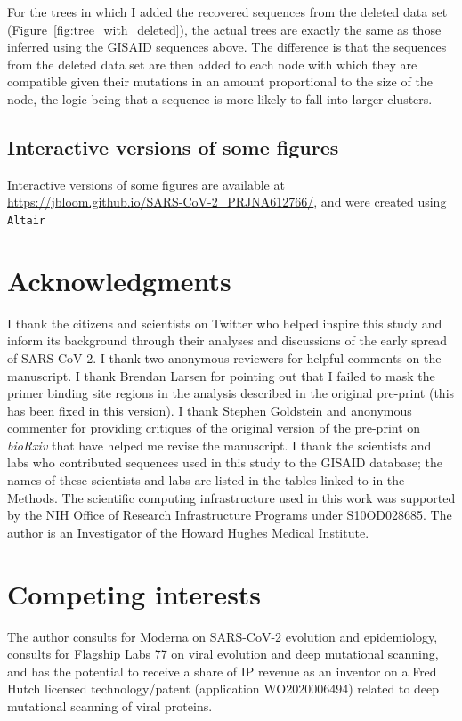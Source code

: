 \documentclass[9pt,twocolumn,twoside]{gsajnl_modified}
\begin{document}
{For the trees in which I added the recovered sequences from the deleted data set (Figure~\ref{fig:tree_with_deleted}), the actual trees are exactly the same as those inferred using the GISAID sequences above.
The difference is that the sequences from the deleted data set are then added to each node with which they are compatible given their mutations in an amount proportional to the size of the node, the logic being that a sequence is more likely to fall into larger clusters.

\subsection{Interactive versions of some figures}
Interactive versions of some figures are available at \url{https://jbloom.github.io/SARS-CoV-2_PRJNA612766/}, and were created using \texttt{Altair}~\citep{vanderplas2018altair}

\section{Acknowledgments}
I thank the citizens and scientists on Twitter who helped inspire this study and inform its background through their analyses and discussions of the early spread of SARS-CoV-2.
I thank two anonymous reviewers for helpful comments on the manuscript.
I thank Brendan Larsen for pointing out that I failed to mask the primer binding site regions in the analysis described in the original pre-print (this has been fixed in this version).
I thank Stephen Goldstein and anonymous commenter for providing critiques of the original version of the pre-print on \textit{bioRxiv} that have helped me revise the manuscript.
I thank the scientists and labs who contributed sequences used in this study to the GISAID database; the names of these scientists and labs are listed in the tables linked to in the Methods.
The scientific computing infrastructure used in this work was supported by the NIH Office of Research Infrastructure Programs under S10OD028685.
The author is an Investigator of the Howard Hughes Medical Institute.

\section{Competing interests}
The author consults for Moderna on SARS-CoV-2 evolution and epidemiology, consults for Flagship Labs 77 on viral evolution and deep mutational scanning, and has the potential to receive a share of IP revenue as an inventor on a Fred Hutch licensed technology/patent (application WO2020006494) related to deep mutational scanning of viral proteins.

}
\end{document}
